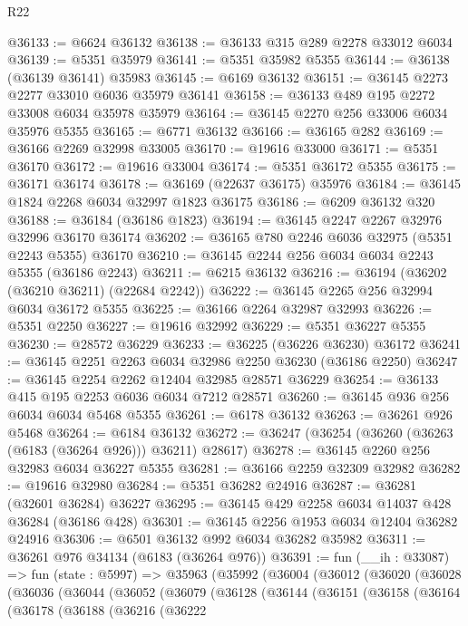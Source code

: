 \begin{lexlean}{R22}
\begin{coremodule}
@36133 := @6624 @36132
@36138 := @36133 @315 @289 @2278 @33012 @6034
@36139 := @5351 @35979
@36141 := @5351 @35982 @5355
@36144 := @36138 (@36139 @36141) @35983
@36145 := @6169 @36132
@36151 := @36145 @2273 @2277 @33010 @6036 @35979 @36141
@36158 := @36133 @489 @195 @2272 @33008 @6034 @35978 @35979
@36164 := @36145 @2270 @256 @33006 @6034 @35976 @5355
@36165 := @6771 @36132
@36166 := @36165 @282
@36169 := @36166 @2269 @32998 @33005
@36170 := @19616 @33000
@36171 := @5351 @36170
@36172 := @19616 @33004
@36174 := @5351 @36172 @5355
@36175 := @36171 @36174
@36178 := @36169 (@22637 @36175) @35976
@36184 := @36145 @1824 @2268 @6034 @32997 @1823 @36175
@36186 := @6209 @36132 @320
@36188 := @36184 (@36186 @1823)
@36194 := @36145 @2247 @2267 @32976 @32996 @36170 @36174
@36202 := @36165 @780 @2246 @6036 @32975 (@5351 @2243 @5355) @36170
@36210 := @36145 @2244 @256 @6034 @6034 @2243 @5355 (@36186 @2243)
@36211 := @6215 @36132
@36216 := @36194 (@36202 (@36210 @36211) (@22684 @2242))
@36222 := @36145 @2265 @256 @32994 @6034 @36172 @5355
@36225 := @36166 @2264 @32987 @32993
@36226 := @5351 @2250
@36227 := @19616 @32992
@36229 := @5351 @36227 @5355
@36230 := @28572 @36229
@36233 := @36225 (@36226 @36230) @36172
@36241 := @36145 @2251 @2263 @6034 @32986 @2250 @36230 (@36186 @2250)
@36247 := @36145 @2254 @2262 @12404 @32985 @28571 @36229
@36254 := @36133 @415 @195 @2253 @6036 @6034 @7212 @28571
@36260 := @36145 @936 @256 @6034 @6034 @5468 @5355
@36261 := @6178 @36132
@36263 := @36261 @926 @5468
@36264 := @6184 @36132
@36272 := @36247 (@36254 (@36260 (@36263 (@6183 (@36264 @926))) @36211) @28617)
@36278 := @36145 @2260 @256 @32983 @6034 @36227 @5355
@36281 := @36166 @2259 @32309 @32982
@36282 := @19616 @32980
@36284 := @5351 @36282 @24916
@36287 := @36281 (@32601 @36284) @36227
@36295 := @36145 @429 @2258 @6034 @14037 @428 @36284 (@36186 @428)
@36301 := @36145 @2256 @1953 @6034 @12404 @36282 @24916
@36306 := @6501 @36132 @992 @6034 @36282 @35982
@36311 := @36261 @976 @34134 (@6183 (@36264 @976))
@36391 := fun (__ih : @33087) =>
  fun (state : @5997) =>
  @35963
    (@35992
      (@36004
        (@36012
          (@36020
            (@36028
              (@36036
                (@36044
                  (@36052
                    (@36079
                      (@36128
                        (@36144
                          (@36151
                            (@36158
                              (@36164
                                (@36178
                                  (@36188
                                    (@36216
                                      (@36222

\end{coremodule}
\end{lexlean}
